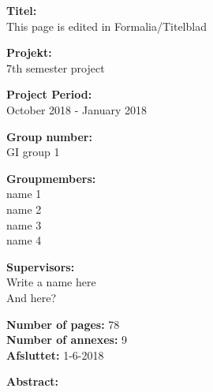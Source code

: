 \begin{minipage}[t]{0.48\textwidth}
\textbf{Titel:} \\[5pt]\hspace{2ex}
This page is edited in Formalia/Titelblad

\vspace*{1cm}

\textbf{Projekt:} \\[5pt]\bigskip\hspace{2ex}
7th semester project

\textbf{Project Period:} \\[5pt]\bigskip\hspace{2ex}
October 2018 - January 2018

\textbf{Group number:} \\[5pt]\bigskip\hspace{2ex}
GI group 1

\textbf{Groupmembers:} \\[5pt]\hspace*{2ex}
name 1 \\\hspace*{2ex}
name 2  \\\hspace*{2ex}
name 3 \\\hspace*{2ex}
name 4 \\\bigskip\hspace{2ex}


\textbf{Supervisors:} \\[5pt]\hspace*{2ex}
Write a name here \\\bigskip\hspace{2ex}
And here? \\\bigskip\hspace{2ex}



\textbf{Number of pages:} 78 \\
\textbf{Number of annexes:} 9 \\ 
\textbf{Afsluttet:} 1-6-2018
 
\end{minipage}
\hfill
\begin{minipage}[t]{0.8\textwidth}%
 \textbf{Abstract:} \\[3pt]
 \fbox{\parbox{8cm}{\bigskip\bigskip}}
\end{minipage}
